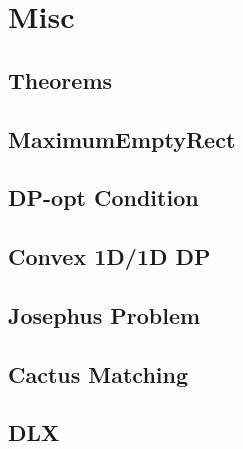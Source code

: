 \documentclass[a4paper,10pt,twocolumn,oneside]{article}
\begin{document}
\section{Misc}
\subsection{Theorems}

\subsection{MaximumEmptyRect}

\subsection{DP-opt Condition}

\subsection{Convex 1D/1D DP}

\subsection{Josephus Problem}

\subsection{Cactus Matching}

\subsection{DLX}

\end{document}
